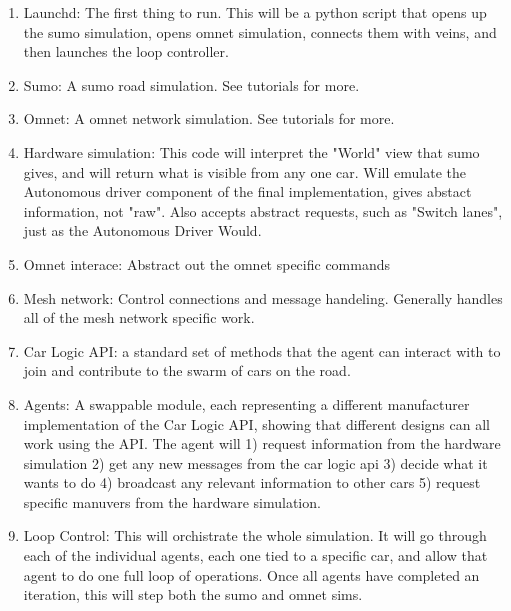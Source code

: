 \documentclass[11pt]{article}
\begin{document}

	\begin{enumerate}
		\item Launchd: The first thing to run. This will be a python script
			that opens up the sumo simulation, opens omnet simulation, connects them
			with veins, and then launches the loop controller.
		\item Sumo: A sumo road simulation. See tutorials for more.
		\item Omnet: A omnet network simulation. See tutorials for more.
		\item Hardware simulation: This code will interpret the "World" view that
			sumo gives, and will return what is visible from any one car. Will emulate
			the Autonomous driver component of the final implementation, gives abstact
			information, not "raw". Also accepts abstract requests, such as "Switch lanes",
			just as the Autonomous Driver Would.
		\item Omnet interace: Abstract out the omnet specific commands
		\item Mesh network: Control connections and message handeling. Generally
			handles all of the mesh network specific work.
		\item Car Logic API: a standard set of methods that the agent can interact
			with to join and contribute to the swarm of cars on the road.
		\item Agents: A swappable module, each representing a different manufacturer
			implementation of the Car Logic API, showing that different designs can
			all work using the API. The agent will 1) request information from the
			hardware simulation 2) get any new messages from the car logic api 3) decide
			what it wants to do 4) broadcast any relevant information to other cars
			5) request specific manuvers from the hardware simulation.
		\item Loop Control: This will orchistrate the whole simulation. It will go
			through each of the individual agents, each one tied to a specific car,
			and allow that agent to do one full loop of operations. Once all agents
			have completed an iteration, this will step both the sumo and omnet sims.
	\end{enumerate}
\end{document}
